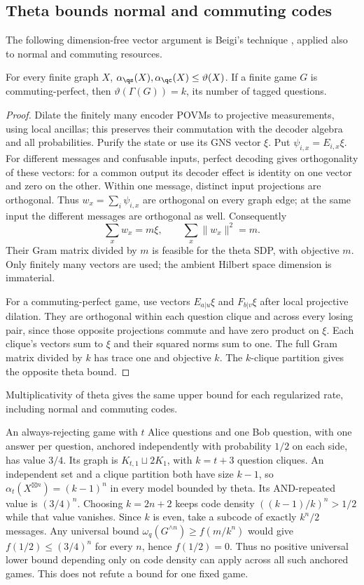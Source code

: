 \subsection{Theta bounds normal and commuting codes}
The following dimension-free vector argument is Beigi's technique
\cite{Beigi}, applied also to normal and commuting resources.
\begin{lemma}\label{lem:thetabounds}
For every finite graph $X$,
$\alpha_{\qs}(X),\alpha_{\qc}(X)\le\vartheta(X)$.
If a finite game $G$ is commuting-perfect, then
$\vartheta(\Gamma(G))=k$, its number of tagged questions.
\end{lemma}
\begin{proof}
Dilate the finitely many encoder POVMs to projective measurements,
using local ancillas; this preserves their commutation with the decoder
algebra and all probabilities. Purify the state or use its GNS vector
$\xi$. Put $\psi_{i,x}=E_{i,x}\xi$. For different messages and confusable
inputs, perfect decoding gives orthogonality of these vectors: for a
common output its decoder effect is identity on one vector and zero on
the other. Within one message, distinct input projections are orthogonal.
Thus $w_x=\sum_i\psi_{i,x}$ are orthogonal on every graph edge; at the
same input the different messages are orthogonal as well. Consequently
\[
 \sum_xw_x=m\xi,\qquad \sum_x\|w_x\|^2=m.
\]
Their Gram matrix divided by $m$ is feasible for the theta SDP, with
objective $m$. Only finitely many vectors are used; the ambient Hilbert
space dimension is immaterial.

For a commuting-perfect game, use vectors $E_{a|u}\xi$ and $F_{b|v}\xi$
after local projective dilation. They are orthogonal within each question
clique and across every losing pair, since those opposite projections
commute and have zero product on $\xi$. Each clique's vectors sum to
$\xi$ and their squared norms sum to one. The full Gram matrix divided
by $k$ has trace one and objective $k$. The $k$-clique partition gives
the opposite theta bound.
\end{proof}
Multiplicativity of theta gives the same upper bound for each regularized
rate, including normal and commuting codes.

\begin{remark}
An always-rejecting game with $t$ Alice questions and one Bob question, with one answer per question,
anchored independently with probability $1/2$ on each side, has value
$3/4$. Its graph is $K_{t,1}\sqcup2K_1$, with $k=t+3$ question cliques.
An independent set and a clique partition both have size $k-1$, so
$\alpha_t(X^{\boxtimes n})=(k-1)^n$ in every model bounded by theta.
Its AND-repeated value is $(3/4)^n$. Choosing $k=2n+2$ keeps code
density $((k-1)/k)^n>1/2$ while that value vanishes. Since $k$ is
even, take a subcode of exactly $k^n/2$ messages. Any universal bound
$\omega_q(G^{\wedge n})\ge f(m/k^n)$ would give
$f(1/2)\le(3/4)^n$ for every $n$, hence $f(1/2)=0$. Thus no positive
universal lower bound depending only on code density can apply across
all such anchored games. This does not refute a bound for one fixed game.
\end{remark}


